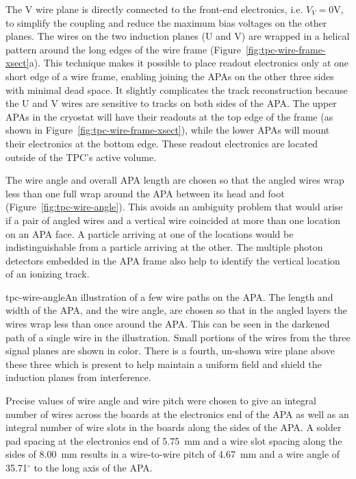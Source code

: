 The V wire plane is directly connected to the front-end electronics, i.e. $V_V=0$V, to simplify the coupling and 
reduce the maximum bias voltages on the other planes. The wires on the two induction planes (U and V) are wrapped in a helical pattern around the long edges of the wire frame 
(Figure~\ref{fig:tpc-wire-frame-xsect}a). This technique makes it possible to place readout 
electronics only at one short edge of a wire frame, enabling joining the APAs on the other three sides with minimal dead space.  It slightly complicates 
the track reconstruction because the U and V wires are sensitive to tracks on 
both sides of the APA.  The upper APAs in the cryostat will have their readouts
at the top edge of the frame (as shown in Figure~\ref{fig:tpc-wire-frame-xsect}), 
while the lower APAs will mount their electronics at the bottom edge.  These readout electronics are located outside of the TPC's active volume.

The wire angle and overall APA length are chosen so that the angled wires wrap less than one full wrap around the APA between its head and foot (Figure~\ref{fig:tpc-wire-angle}).  This avoids an ambiguity problem that would arise if a pair of angled wires and a vertical wire coincided at more than one location on an APA face.  A particle arriving at one of the locations would be indistinguishable from a particle arriving at the other.  The multiple photon detectors embedded in the APA frame also help to identify the vertical location of an ionizing track.

\begin{cdrfigure}{tpc-wire-angle}{An illustration of a few wire paths on the APA.  The length and width of the APA, and the wire angle, are chosen so that in the angled layers the wires wrap less than once around the APA.  This can be seen in the darkened path of a single wire in the illustration.  Small portions of the wires from the three signal planes are shown in color.  There is a fourth, un-shown wire plane above these three which is present to help maintain a uniform field and shield the induction planes from interference.}
\end{cdrfigure}



Precise values of wire angle and wire pitch were chosen to give an integral number of wires across the boards at the electronics end of the APA as well as an integral number of wire slots in the boards along the sides of the APA.  A solder pad spacing at the electronics end of 5.75~mm and a wire slot spacing along the sides of 8.00~mm results in a wire-to-wire pitch of 4.67~mm and a wire angle of 35.71$^\circ$ to the long axis of the APA.


